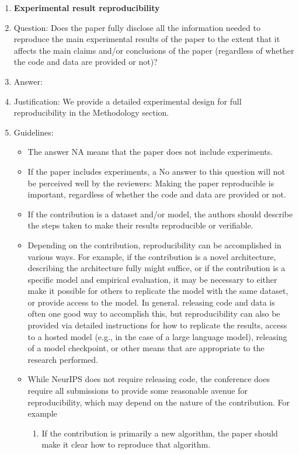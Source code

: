 \documentclass{article}
\begin{document}
\begin{enumerate}
    \item {\bf Experimental result reproducibility}
    \item[] Question: Does the paper fully disclose all the information needed to reproduce the main experimental results of the paper to the extent that it affects the main claims and/or conclusions of the paper (regardless of whether the code and data are provided or not)?
    \item[] Answer: \answerYes{} %
    \item[] Justification: We provide a detailed experimental design for full reproducibility in the Methodology section.  
    \item[] Guidelines:
    \begin{itemize}
        \item The answer NA means that the paper does not include experiments.
        \item If the paper includes experiments, a No answer to this question will not be perceived well by the reviewers: Making the paper reproducible is important, regardless of whether the code and data are provided or not.
        \item If the contribution is a dataset and/or model, the authors should describe the steps taken to make their results reproducible or verifiable. 
        \item Depending on the contribution, reproducibility can be accomplished in various ways. For example, if the contribution is a novel architecture, describing the architecture fully might suffice, or if the contribution is a specific model and empirical evaluation, it may be necessary to either make it possible for others to replicate the model with the same dataset, or provide access to the model. In general. releasing code and data is often one good way to accomplish this, but reproducibility can also be provided via detailed instructions for how to replicate the results, access to a hosted model (e.g., in the case of a large language model), releasing of a model checkpoint, or other means that are appropriate to the research performed.
        \item While NeurIPS does not require releasing code, the conference does require all submissions to provide some reasonable avenue for reproducibility, which may depend on the nature of the contribution. For example
        \begin{enumerate}
            \item If the contribution is primarily a new algorithm, the paper should make it clear how to reproduce that algorithm.

\end{enumerate}
\end{itemize}
\end{enumerate}
\end{document}

